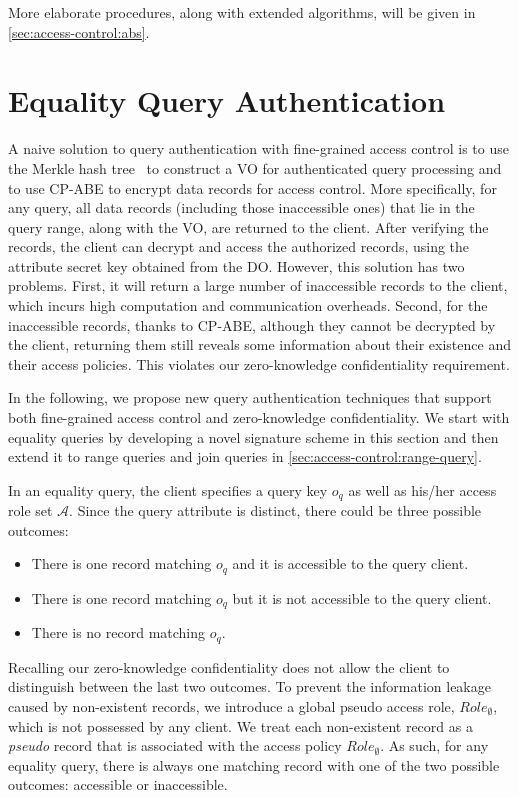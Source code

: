 More elaborate procedures, along with extended algorithms, will be given in \cref{sec:access-control:abs}.

\section{Equality Query Authentication}\label{sec:access-control:equality-query}

A naive solution to query authentication with fine-grained access control is to use the Merkle hash tree~\cite{10.1007/0-387-34805-0_21} to construct a VO for authenticated query processing and to use CP-ABE to encrypt data records for access control. More specifically, for any query, all data records (including those inaccessible ones) that lie in the query range, along with the VO, are returned to the client. After verifying the records, the client can decrypt and access the authorized records, using the attribute secret key obtained from the DO\@. However, this solution has two problems. First, it will return a large number of inaccessible records to the client, which incurs high computation and communication overheads. Second, for the inaccessible records, thanks to CP-ABE, although they cannot be decrypted by the client, returning them still reveals some information about their existence and their access policies. This violates our zero-knowledge confidentiality requirement.

In the following, we propose new query authentication techniques that support both fine-grained access control and zero-knowledge confidentiality. We start with equality queries by developing a novel signature scheme in this section and then extend it to range queries and join queries in \cref{sec:access-control:range-query}.

In an equality query, the client specifies a query key $o_q$ as well as his/her access role set $\mathcal{A}$. Since the query attribute is distinct, there could be three possible outcomes:
\begin{itemize}
  \item There is one record matching $o_q$ and it is accessible to the query client.
  \item There is one record matching $o_q$ but it is not accessible to the query client.
  \item There is no record matching $o_q$.
\end{itemize}

Recalling our zero-knowledge confidentiality does not allow the client to distinguish between the last two outcomes. To prevent the information leakage caused by non-existent records, we introduce a global pseudo access role, ${Role}_{\emptyset}$, which is not possessed by any client. We treat each non-existent record as a \emph{pseudo} record that is associated with the access policy ${Role}_{\emptyset}$. As such, for any equality query, there is always one matching record with one of the two possible outcomes: accessible or inaccessible.

